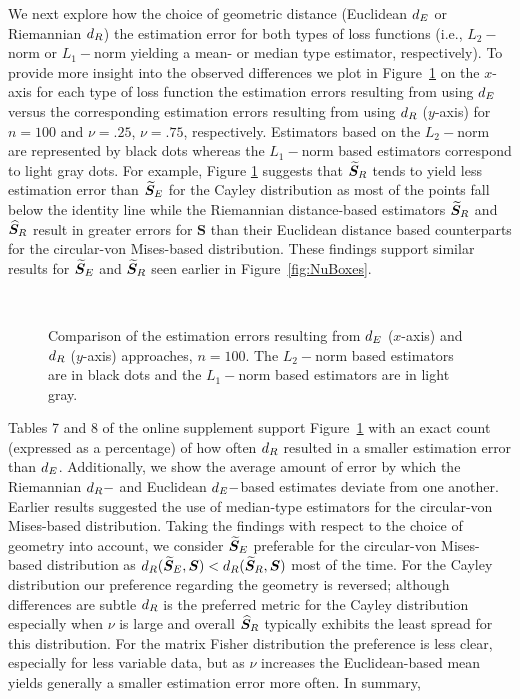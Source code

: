 We next explore how the choice of geometric distance (Euclidean ${d_E}$ or Riemannian ${d_R}$)  the estimation error for both types of loss functions (i.e., $L_2-$norm or $L_1-$norm yielding a mean- or median type estimator, respectively). To provide more insight into the observed differences we plot in Figure~\ref{fig:comPL2} on the $x$-axis for each type of loss function  the estimation errors resulting from using ${d_E}$ versus the corresponding estimation errors resulting from using ${d_R}$ ($y$-axis) for $n=100$ and $\nu=.25$,  $\nu=.75$, respectively.   Estimators based on the $L_2-$norm  are represented by black dots whereas the $L_1-$norm based estimators correspond to light gray dots. For example, Figure \ref{fig:comPL2} suggests that  ${\widetilde{\bm S}_R}$ tends to yield less estimation error than ${\widetilde{\bm S}_E}$  for the Cayley distribution as most of the points fall below the identity line while the Riemannian distance-based estimators ${\widetilde{\bm S}_R}$ and ${\widehat{\bm S}_R}$ result in greater errors for ${\bm S}$ than their Euclidean distance based counterparts for the circular-von Mises-based distribution. These findings support similar results for ${\widetilde{\bm S}_E}$ and ${\widetilde{\bm S}_R}$ seen earlier in Figure~\ref{fig:NuBoxes}.
\begin{figure}[h!]
\centering
{}\\
\caption{Comparison of the estimation errors resulting from ${d_E}$ ($x$-axis) and ${d_R}$ ($y$-axis) approaches, $n=100$.  The $L_2-$norm based estimators are in black dots and the $L_1-$norm based estimators are in light gray.}
\label{fig:comPL2}
\end{figure}
Tables 7 and 8 of the online supplement support Figure~\ref{fig:comPL2} with an exact count (expressed as a percentage) of how often ${d_R}$ resulted in a smaller estimation error than ${d_E}$.  Additionally, we show the average amount of error by which the Riemannian ${d_R}-$ and Euclidean ${d_E}-$based estimates deviate from one another.   
Earlier results suggested the use of median-type estimators for the circular-von Mises-based distribution. Taking the findings with respect to the choice of geometry into account, we consider ${\widetilde{\bm S}_E}$ preferable for the circular-von Mises-based distribution as ${d_R}({\widetilde{\bm S}_E},\bm S) < {d_R}({\widetilde{\bm S}_R},\bm S)$ most of the time.  For the Cayley distribution our preference regarding the geometry is reversed; although differences are subtle ${d_R}$ is the preferred metric for the Cayley distribution especially when $\nu$ is large and overall ${\widehat{\bm S}_R}$ typically exhibits the least spread for this distribution.   For the  matrix Fisher distribution the preference is less clear, especially for less variable data, but as $\nu$ increases the Euclidean-based mean yields generally a smaller estimation error more often. In summary,
